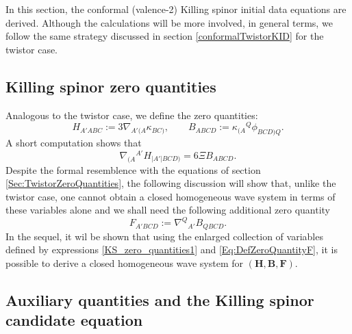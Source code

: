 \documentclass[10pt,a4paper]{article}
\theoremstyle{plain}
\def\bmB{{\bm B}}
\def\bmF{{\bm F}}
\def\bmH{{\bm H}}
\begin{document}
In this section, the conformal (valence-2) Killing spinor initial data
equations are derived.  Although the calculations will be more
involved, in general terms, we follow the same strategy discussed in
section \ref{conformalTwistorKID} for the twistor case.

\subsection{Killing spinor zero quantities}

Analogous to the twistor case, we define the zero quantities:
\begin{equation}\label{KS_zero_quantities1}
H_{A'ABC}:=3\nabla_{A'(A}\kappa_{BC)}, \qquad B_{ABCD}:=\kappa_{(A}{}^Q\phi_{BCD)Q}.
\end{equation}
A short computation shows that
\begin{equation}
\nabla_{(A}{}^{A'}H_{\vert A'\vert BCD)} = 6\Xi
B_{ABCD}. \label{Eq:BuchdahlAsCurlOfH}
\end{equation}
Despite the formal resemblence with the equations of section
\ref{Sec:TwistorZeroQuantities}, the following discussion
will show that, unlike the twistor case, one cannot obtain a closed
homogeneous wave system in terms of these variables alone and we shall
need the following additional zero quantity
\begin{equation}
 F_{A'BCD}:=\nabla^Q{}_{A'}B_{QBCD}.\label{Eq:DefZeroQuantityF}
\end{equation}
In the sequel, it wil be shown that using the enlarged collection of variables
 defined by expressions \eqref{KS_zero_quantities1} and \eqref{Eq:DefZeroQuantityF},
it is possible to derive
a closed homogeneous wave system for $(\bmH, \bmB, \bmF)$. 


\subsection{Auxiliary quantities and the Killing spinor candidate equation}
\end{document}
